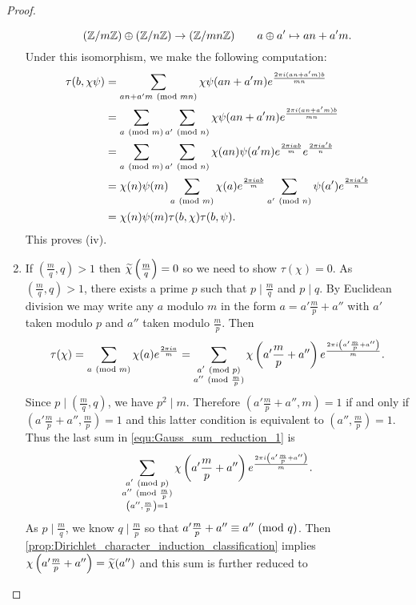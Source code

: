 \begin{proof}
\begin{enumerate}[label*=(\roman*)]
          \[
            (\mathbb{Z}/m\mathbb{Z}) \oplus (\mathbb{Z}/n\mathbb{Z}) \to (\mathbb{Z}/mn\mathbb{Z}) \qquad a \oplus a' \mapsto an+a'm.
          \]
          Under this isomorphism, we make the following computation:
          \begin{align*}
            \tau(b,\chi\psi) &= \sum_{an+a'm \ (\mathrm{mod}\text{ }mn)}\chi\psi(an+a'm)e^{\frac{2\pi i(an+a'm)b}{mn}} \\
            &= \sum_{a\ (\mathrm{mod}\text{ }m)}\sum_{a'\ (\mathrm{mod}\text{ }n)}\chi\psi(an+a'm)e^{\frac{2\pi i(an+a'm)b}{mn}} \\
            &= \sum_{a\ (\mathrm{mod}\text{ }m)}\sum_{a'\ (\mathrm{mod}\text{ }n)}\chi(an)\psi(a'm)e^{\frac{2\pi iab}{m}}e^{\frac{2\pi ia'b}{n}} \\
            &= \chi(n)\psi(m)\sum_{a\ (\mathrm{mod}\text{ }m)}\chi(a)e^{\frac{2\pi iab}{m}}\sum_{a'\ (\mathrm{mod}\text{ }n)}\psi(a')e^{\frac{2\pi ia'b}{n}} \\
            &= \chi(n)\psi(m)\tau(b,\chi)\tau(b,\psi).
          \end{align*}
          This proves (iv).
          \item If $\left(\frac{m}{q},q\right) > 1$ then $\widetilde{\chi}\left(\frac{m}{q}\right) = 0$ so we need to show $\tau(\chi) = 0$. As $\left(\frac{m}{q},q\right) > 1$, there exists a prime $p$ such that $p \mid \frac{m}{q}$ and $p \mid q$. By Euclidean division we may write any $a$ modulo $m$ in the form $a = a'\frac{m}{p}+a''$ with $a'$ taken modulo $p$ and $a''$ taken modulo $\frac{m}{p}$. Then
          \begin{equation}\label{equ:Gauss_sum_reduction_1}
            \tau(\chi) = \sum_{a \ (\mathrm{mod}\text{ }m)}\chi(a)e^{\frac{2\pi ia}{m}} = \sum_{\substack{a' \ (\mathrm{mod}\text{ }p) \\ a'' \ (\mathrm{mod}\text{ }\frac{m}{p})}}\chi\left(a'\frac{m}{p}+a''\right)e^{\frac{2\pi i\left(a'\frac{m}{p}+a''\right)}{m}}.
          \end{equation}
          Since $p \mid \left(\frac{m}{q},q\right)$, we have $p^{2} \mid m$. Therefore $\left(a'\frac{m}{p}+a'',m\right) = 1$ if and only if $\left(a'\frac{m}{p}+a'',\frac{m}{p}\right) = 1$ and this latter condition is equivalent to $\left(a'',\frac{m}{p}\right) = 1$. Thus the last sum in \cref{equ:Gauss_sum_reduction_1} is
          \[
            \sum_{\substack{a' \ (\mathrm{mod}\text{ }p) \\ a'' \ (\mathrm{mod}\text{ }\frac{m}{p}) \\ \left(a'',\frac{m}{p}\right) = 1}}\chi\left(a'\frac{m}{p}+a''\right)e^{\frac{2\pi i\left(a'\frac{m}{p}+a''\right)}{m}}.
          \]
          As $p \mid \frac{m}{q}$, we know $q \mid \frac{m}{p}$ so that $a'\frac{m}{p}+a'' \equiv a'' \ (\mathrm{mod}\text{ }q)$. Then \cref{prop:Dirichlet_character_induction_classification} implies $\chi\left(a'\frac{m}{p}+a''\right) = \widetilde{\chi}(a'')$ and this sum is further reduced to

\end{enumerate}
\end{proof}

